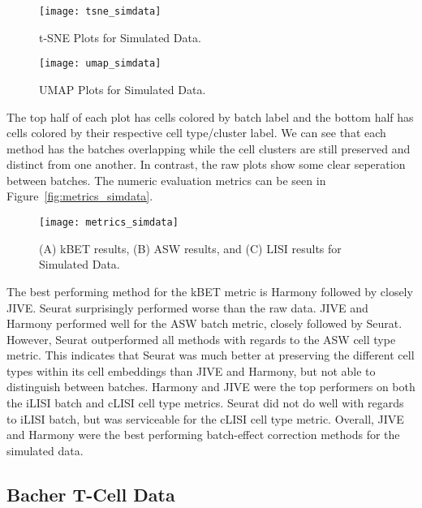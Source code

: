 \documentclass[
12pt, %
letterpaper, %
oneside, %
headinclude,footinclude, %
BCOR5mm, %
]{scrartcl}
\begin{document}
\begin{figure}[H]
    \centering 
    \texttt{[image: tsne\_simdata]} 
    \caption[t-SNE Plots for Simulated Data]{t-SNE Plots for Simulated Data.}
    \label{fig:tsne_simdata}
\end{figure}

\begin{figure}[H]
    \centering 
    \texttt{[image: umap\_simdata]} 
    \caption[UMAP Plots for Simulated Data]{UMAP Plots for Simulated Data.}
    \label{fig:umap_simdata} 
\end{figure}

The top half of each plot has cells colored by batch label and the bottom half has cells colored by their respective cell type/cluster label. We can see that each method has the batches overlapping while the cell clusters are still preserved and distinct from one another. In contrast, the raw plots show some clear seperation between batches. The numeric evaluation metrics can be seen in Figure~\vref{fig:metrics_simdata}.

\begin{figure}[H]
    \centering 
    \texttt{[image: metrics\_simdata]} 
    \caption[Metrics for Simulated Data]{(A) kBET results, (B) ASW results, and (C) LISI results for Simulated Data.}
    \label{fig:metrics_simdata} 
\end{figure}

The best performing method for the kBET metric is Harmony followed by closely JIVE. Seurat surprisingly performed worse than the raw data. JIVE and Harmony performed well for the ASW batch metric, closely followed by Seurat. However, Seurat outperformed all methods with regards to the ASW cell type metric. This indicates that Seurat was much better at preserving the different cell types within its cell embeddings than JIVE and Harmony, but not able to distinguish between batches. Harmony and JIVE were the top performers on both the iLISI batch and cLISI cell type metrics. Seurat did not do well with regards to iLISI batch, but was serviceable for the cLISI cell type metric. Overall, JIVE and Harmony were the best performing batch-effect correction methods for the simulated data.


\subsection{Bacher T-Cell Data}
\end{document}
